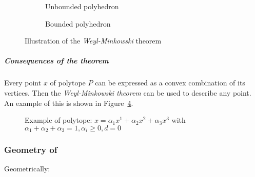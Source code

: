 \documentclass[english]{article}
\begin{document}
\begin{figure}[htbp]
  \centering
  \bigskip
  \begin{subfigure}[h]{0.495\textwidth}
    \centering
    \bigskip
    \caption{Unbounded polyhedron}
    \label{subfig:unbounded-polyhedron}
    \bigskip
  \end{subfigure}
  \begin{subfigure}[h]{0.495\textwidth}
    \centering
    \bigskip
    \caption{Bounded polyhedron}
    \label{subfig:bounded-polyhedron}
    \bigskip
  \end{subfigure}
  \caption{Illustration of the \textit{Weyl-Minkowski} theorem}
  \label{fig:weyl-minkowski-theorem}
  \bigskip
\end{figure}

\subparagraph*{Consequences of the theorem}
Every point \(x\) of polytope \(P\) can be expressed as a convex combination of its vertices.
Then the \textit{Weyl-Minkowski theorem} can be used to describe any point.
An example of this is shown in Figure~\ref{fig:polytope-example}.

\begin{figure}[htbp]
  \bigskip
  \centering
  \caption{Example of polytope: \(x = \alpha_1 x^1 + \alpha_2 x^2 + \alpha_3 x^3\) with \(\alpha_1 + \alpha_2 + \alpha_3 = 1, \alpha_i \geq 0, d = 0\)}
  \label{fig:polytope-example}
  \bigskip
\end{figure}

\subsubsection{Geometry of \LP}

Geometrically:
\end{document}
